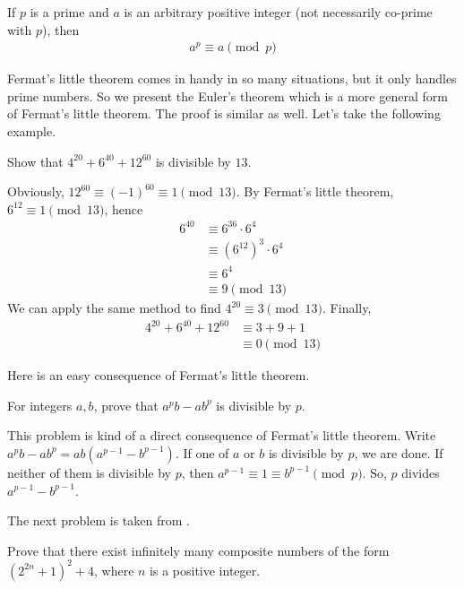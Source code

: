 \documentclass{subfile}
\begin{document}
		 \begin{corollary}
		 	If $p$ is a prime and $a$ is an arbitrary positive integer (not necessarily co-prime with $p$), then
		 	\begin{align*}
		 	a^p \equiv a \pmod p
		 	\end{align*}
		 \end{corollary}
	Fermat's little theorem comes in handy in so many situations, but it only handles prime numbers. So we present the Euler's theorem which is a more general form of Fermat's little theorem. The proof is similar as well. Let's take the following example.

		\begin{problem}
			Show that $4^{20} + 6^{40} + 12^{60}$ is divisible by $13$.
		\end{problem}

		\begin{solution}
			Obviously, $12^{60}\equiv (-1)^{60} \equiv 1 \pmod {13}$. By Fermat's little theorem, $6^{12} \equiv 1 \pmod{13}$, hence
				\begin{align*}
					6^{40}
						& \equiv 6^{36} \cdot 6^4\\
						& \equiv \left(6^{12}\right)^3 \cdot 6^4\\
						& \equiv 6^4\\
						& \equiv 9 \pmod{13}
				\end{align*}
			We can apply the same method to find $4^{20} \equiv 3 \pmod{13}$. Finally,
				\begin{align*}
					4^{20} + 6^{40} + 12^{60}
						& \equiv 3+9+1\\
						& \equiv 0 \pmod{13}
				\end{align*}
		\end{solution}
	Here \textcite[Page $29$, Example $1.29$]{andreescuandricafeng2007} is an easy consequence of Fermat's little theorem.
		\begin{problem}\label{e2}
			For integers $a,b$, prove that $a^pb-ab^p$ is divisible by $p$.
		\end{problem}

		\begin{solution}
			This problem is kind of a direct consequence of Fermat's little theorem. Write $a^pb-ab^p=ab(a^{p-1}-b^{p-1})$. If one of $a$ or $b$ is divisible by $p$, we are done. If neither of them is divisible by $p$, then $a^{p-1}\equiv1\equiv b^{p-1}\pmod p$. So, $p$ divides $a^{p-1}-b^{p-1}$.
		\end{solution}
	The next problem is taken from \textcite[Problem $124$]{WaclawSierpinski1964}.
		\begin{problem}
			Prove that there exist infinitely many composite numbers of the form $(2^{2n}+1 )^2+4$, where $n$ is a positive integer.
		\end{problem}
\end{document}
